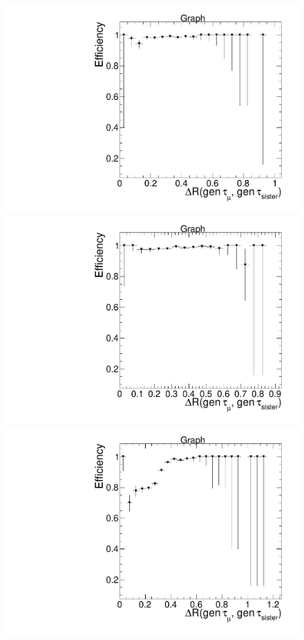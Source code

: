 \begin{figure}[hbtp]
  \begin{center}
    \includegraphics[width=0.8\cmsFigWidth]{figures/dRIsoEfficiency_withFilters_muEOnly}
    \includegraphics[width=0.8\cmsFigWidth]{figures/dRIsoEfficiency_withFilters_muMuOnly}
    \includegraphics[width=0.8\cmsFigWidth]{figures/dRIsoEfficiency_withFilters_muHadOnly}

\end{center}
\end{figure}
